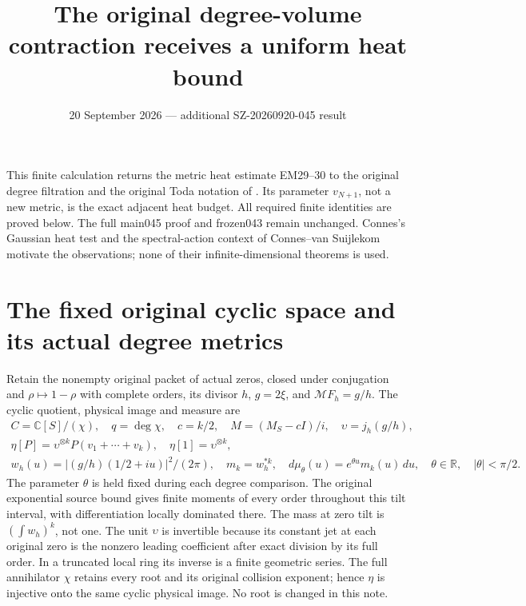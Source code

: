 \documentclass[11pt]{article}
\title{The original degree-volume contraction receives a uniform heat bound}
\author{}\date{20 September 2026 --- additional SZ-20260920-045 result}
\newcommand{\C}{\mathbb C}\newcommand{\R}{\mathbb R}
\begin{document}
\maketitle

This finite calculation returns the metric heat estimate EM29--30
\cite{EM} to the original degree filtration and the original Toda
notation of \cite{TV}. Its parameter \(v_{N+1}\), not a new metric,
is the exact adjacent heat budget. All required finite identities are
proved below. The full main045 proof and frozen043 remain unchanged.
Connes's Gaussian heat test \cite{Connes} and the spectral-action
context of Connes--van Suijlekom \cite{CV} motivate the observations;
none of their infinite-dimensional theorems is used.

\section{The fixed original cyclic space and its actual degree metrics}

Retain the nonempty original packet of actual zeros, closed under
conjugation and \(\rho\mapsto1-\rho\) with complete orders, its divisor
\(h\), \(g=2\xi\), and \(\mathcal MF_h=g/h\).
The cyclic quotient, physical image and measure are
\begin{equation}\tag{VH1}\label{VH1}
\begin{gathered}
C=\C[S]/(\chi),\quad q=\deg\chi,\quad c=k/2,\quad
M=(M_S-cI)/i,\quad \upsilon=j_h(g/h),\\
\eta[P]=\upsilon^{\otimes k}P(v_1+\cdots+v_k),\quad
\eta[1]=\upsilon^{\otimes k},\\
w_h(u)=|(g/h)(1/2+iu)|^2/(2\pi),\quad m_k=w_h^{*k},\quad
d\mu_\theta(u)=e^{\theta u}m_k(u)\,du,
\quad\theta\in\R,\quad|\theta|<\pi/2.
\end{gathered}
\end{equation}
The parameter \(\theta\) is held fixed during each degree comparison.
The original exponential source bound gives finite moments of every
order throughout this tilt interval, with differentiation locally
dominated there. The mass at zero tilt is \((\int w_h)^k\), not one.
The unit \(\upsilon\) is invertible because its constant jet at each
original zero is the nonzero leading coefficient after exact division
by its full order. In a truncated local ring its inverse is a finite
geometric series. The full annihilator \(\chi\) retains every root
and its original collision exponent; hence \(\eta\) is injective
onto the same cyclic physical image. No root is changed in this note.
\end{document}

